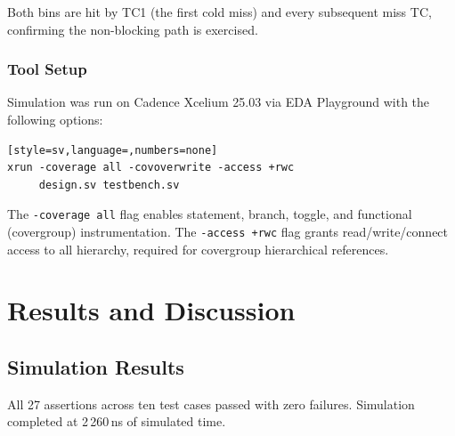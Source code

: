 \documentclass[12pt,letterpaper]{report}
\begin{document}
Both bins are hit by TC1 (the first cold miss) and every subsequent
miss TC, confirming the non-blocking path is exercised.

\subsection{Tool Setup}

Simulation was run on Cadence Xcelium 25.03 via EDA Playground with
the following options:

\begin{lstlisting}[style=sv,language=,numbers=none]
xrun -coverage all -covoverwrite -access +rwc
     design.sv testbench.sv
\end{lstlisting}

The \texttt{-coverage all} flag enables statement, branch, toggle, and
functional (covergroup) instrumentation.  The \texttt{-access +rwc}
flag grants read/write/connect access to all hierarchy, required for
covergroup hierarchical references.

\chapter{Results and Discussion}
\label{ch:results}

\section{Simulation Results}

All 27 assertions across ten test cases passed with zero failures.
Simulation completed at 2\,260\,ns of simulated time.
\end{document}

